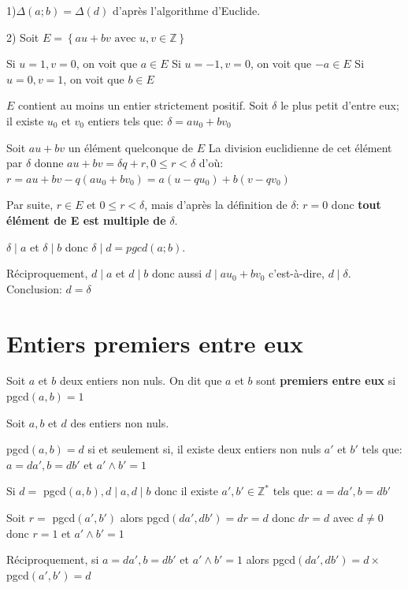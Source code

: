\documentclass[french]{book}
\begin{document}
\begin{demo}

1)$\Delta(a;b)=\Delta(d)$ d'après l'algorithme d'Euclide.

2) Soit $E=\left\lbrace au+bv \text{ avec } u,v\in \mathbb{Z}\right\rbrace $

Si $u=1,v=0$, on voit que $a\in E$
Si $u=-1,v=0$, on voit que $-a\in E$
Si $u=0,v=1$, on voit que $b\in E$

$E$ contient au moins un entier strictement positif. Soit $\delta$ le plus petit d'entre eux;
il existe $u_{0}$ et $v_{0}$ entiers tels que: $\delta=au_{0}+bv_{0}$

Soit $au+bv$ un élément quelconque de $E$ La division euclidienne de cet élément par $\delta$ donne
  $au+bv=\delta q+r, 0 \leq r < \delta $ d'où: $r=au+bv-q \left(au_{0}+bv_{0}\right)=a \left( u-qu_{0}\right) +b\left( v-qv_{0}\right) $
 
 
 
 Par suite, $r\in E$ et $0 \leq r < \delta$, mais d'après la définition de $\delta$: $r=0$ donc \textbf{tout élément de E est multiple de } $\delta$.
 
 $\delta\mid a$ et $\delta\mid b$ donc $\delta\mid d=pgcd(a;b)$.
 
 Réciproquement, $d\mid a$ et $d\mid b$ donc aussi $d\mid au_{0}+bv_{0}$ c'est-à-dire, $d\mid\delta$. Conclusion: $d=\delta$
 
 
\end{demo}




\section{Entiers premiers entre eux}


\begin{defn}

Soit $a$ et $b$ deux entiers non nuls. On dit que $a$ et $b$ sont \textbf{premiers entre eux} si pgcd$(a,b)=1$

\end{defn} 
 
\begin{thm}

Soit $a,b$ et $d$ des entiers non nuls. 

pgcd$(a,b)=d$ si et seulement si, il existe deux entiers non nuls $a'$ et $b'$ tels que: $a=da',b=db'$ et $a'\wedge b'=1$
 
\end{thm}

\begin{demo}

  Si $d=$ pgcd$(a,b), d\mid a, d\mid b$ donc il existe $a', b' \in \mathbb{Z}^{*}$ tels que: $a=da', b=db'$
  
  Soit $r=$ pgcd$(a',b')$ alors pgcd$(da',db')=dr=d$ donc $dr=d$ avec $d\neq 0$ donc $r=1$ et $a'\wedge b'=1$
  
  Réciproquement, si $a=da', b=db'$ et $a'\wedge b'=1$ alors pgcd$(da',db')=d \times$pgcd$(a',b')=d$
 
\end{demo}
\end{document}
